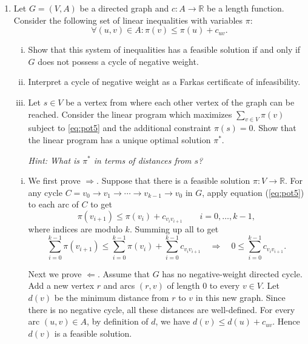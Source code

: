 \documentclass[11pt]{article}
\institute{\'Ecole Polytechnique F\'ed\'erale de Lausanne}
\renewcommand{\leq}{\leqslant}
\begin{document}
\makeheader

\begin{enumerate}[1)]

\item \label{Ex:Node-Pot} Let $G = (V,A)$ be a directed graph and $c: A \to \mathbb{R}$ be a length function. Consider the following set of linear inequalities with variables $\pi$:
  \begin{equation}\label{eq:pot5}
    \forall (u,v) \in A: \pi(v) \leq \pi(u) + c_{uv}.
  \end{equation}
  \begin{enumerate}[i)]
  \item   Show that this system of inequalities has a feasible solution if and only if $G$ does not possess a cycle of negative weight.
  \item  Interpret a cycle of negative weight as a Farkas certificate of infeasibility.
  \item Let $s \in V$ be a vertex from where each other vertex of the graph can be reached.  Consider the linear program which maximizes $\sum_{v \in V} \pi(v) $ subject to \ref{eq:pot5} and the additional constraint $\pi(s) = 0$. Show that the linear program has a unique optimal solution $\pi^*$.
  
  \emph{Hint: What is $\pi^*$ in terms of distances from $s$? }
\end{enumerate}

\begin{solution}
\begin{enumerate}[i)]
\item We first prove $\Rightarrow$. Suppose that there is a feasible solution $\pi: V \to \mathbb{R}$. For any cycle $C=v_0\rightarrow v_1\rightarrow \cdots \rightarrow v_{k-1}\rightarrow v_0$ in $G$, 
apply equation (\ref{eq:pot5}) to each arc of $C$ to get
\[
\pi(v_{i+1}) \leq \pi(v_i) + c_{v_i v_{i+1}} \qquad i=0,\ldots,k-1,
\]
where indices are modulo $k$. Summing up all to get
\[
\sum_{i=0}^{k-1} \pi(v_{i+1})
\leq
\sum_{i=0}^{k-1} \pi(v_i) + \sum_{i=0}^{k-1} c_{v_i v_{i+1}} \quad\Rightarrow\quad 0 \leq \sum_{i=0}^{k-1} c_{v_i v_{i+1}}.
\]

Next we prove $\Leftarrow$. Assume that $G$ has no negative-weight directed cycle. Add a new vertex $r$ and arcs $(r,v)$ of length $0$ to every $v \in V$. Let $d(v)$ be the minimum distance from $r$ to $v$ in this new graph. Since there is no negative cycle, all these distances are well-defined. For every arc $(u,v) \in A$, by definition of $d$, we have $d(v) \leq d(u) + c_{uv}$. Hence $d(v)$ is a feasible solution.


\end{enumerate}
\end{solution}
\end{enumerate}
\end{document}
